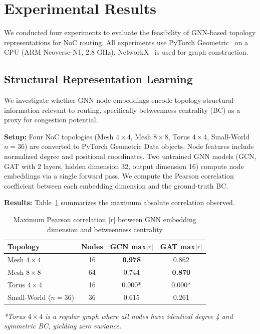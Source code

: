 \documentclass[conference]{IEEEtran}
\begin{document}
\section{Experimental Results}
\label{sec:results}

We conducted four experiments to evaluate the feasibility of GNN-based topology representations for NoC routing. All experiments use PyTorch Geometric~\cite{pyg2019} on a CPU (ARM Neoverse-N1, 2.8 GHz). NetworkX~\cite{networkx2008} is used for graph construction.

\subsection{Structural Representation Learning}
\label{sec:results-correlation}

We investigate whether GNN node embeddings encode topology-structural information relevant to routing, specifically betweenness centrality (BC) as a proxy for congestion potential.

\textbf{Setup:} Four NoC topologies (Mesh $4\times4$, Mesh $8\times8$, Torus $4\times4$, Small-World $n=36$) are converted to PyTorch Geometric Data objects. Node features include normalized degree and positional coordinates. Two untrained GNN models (GCN, GAT with 2 layers, hidden dimension 32, output dimension 16) compute node embeddings via a single forward pass. We compute the Pearson correlation coefficient between each embedding dimension and the ground-truth BC.

\textbf{Results:} Table~\ref{tab:correlation} summarizes the maximum absolute correlation observed.

\begin{table}[h]
\centering
\caption{Maximum Pearson correlation $|r|$ between GNN embedding dimension and betweenness centrality}
\label{tab:correlation}
\small
\begin{tabular}{lccc}
\toprule
\textbf{Topology} & \textbf{Nodes} & \textbf{GCN max$|r|$} & \textbf{GAT max$|r|$} \\
\midrule
Mesh $4\times4$ & 16 & \textbf{0.978} & 0.862 \\
Mesh $8\times8$ & 64 & 0.744 & \textbf{0.870} \\
Torus $4\times4$ & 16 & 0.000* & 0.000* \\
Small-World ($n=36$) & 36 & 0.615 & 0.261 \\
\bottomrule
\end{tabular}
\vspace{2mm}
\small\textit{*Torus $4\times4$ is a regular graph where all nodes have identical degree 4 and symmetric BC, yielding zero variance.}
\end{table}
\end{document}
